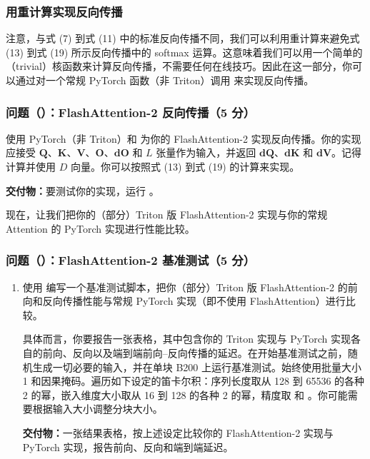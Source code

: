 \subsubsection*{用重计算实现反向传播}

注意，与式 (7) 到式 (11) 中的标准反向传播不同，我们可以利用重计算来避免式 (13) 到式 (19) 所示反向传播中的 softmax 运算。这意味着我们可以用一个简单的（trivial）核函数来计算反向传播，不需要任何在线技巧。因此在这一部分，你可以通过对一个常规 PyTorch 函数（非 Triton）调用  来实现反向传播。

\subsubsection*{问题（）：FlashAttention-2 反向传播（5 分）}

使用 PyTorch（非 Triton）和  为你的 FlashAttention-2  实现反向传播。你的实现应接受 $\boldsymbol{Q}$、$\boldsymbol{K}$、$\boldsymbol{V}$、$\boldsymbol{O}$、$\boldsymbol{dO}$ 和 $L$ 张量作为输入，并返回 $\boldsymbol{dQ}$、$\boldsymbol{dK}$ 和 $\boldsymbol{dV}$。记得计算并使用 $D$ 向量。你可以按照式 (13) 到式 (19) 的计算来实现。

\textbf{交付物：}要测试你的实现，运行 。

现在，让我们把你的（部分）Triton 版 FlashAttention-2 实现与你的常规 Attention 的 PyTorch 实现进行性能比较。

\subsubsection*{问题（）：FlashAttention-2 基准测试（5 分）}

\begin{enumerate}[label=(\alph*)]
  \item 使用  编写一个基准测试脚本，把你（部分）Triton 版 FlashAttention-2 的前向和反向传播性能与常规 PyTorch 实现（即不使用 FlashAttention）进行比较。

  具体而言，你要报告一张表格，其中包含你的 Triton 实现与 PyTorch 实现各自的前向、反向以及端到端前向--反向传播的延迟。在开始基准测试之前，随机生成一切必要的输入，并在单块 B200 上运行基准测试。始终使用批量大小 1 和因果掩码。遍历如下设定的笛卡尔积：序列长度取从 128 到 65536 的各种 2 的幂，嵌入维度大小取从 16 到 128 的各种 2 的幂，精度取  和 。你可能需要根据输入大小调整分块大小。

  \textbf{交付物：}一张结果表格，按上述设定比较你的 FlashAttention-2 实现与 PyTorch 实现，报告前向、反向和端到端延迟。
\end{enumerate}

